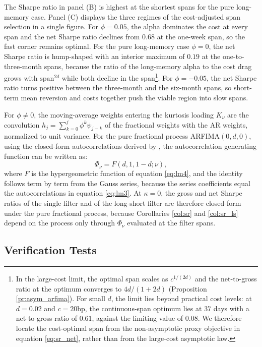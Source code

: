 \documentclass[hidelinks]{siamonline250211}
\newcommand{\spn}{\mathrm{span}}
\begin{document}
The Sharpe ratio in panel (B) is highest at the shortest spans for the pure long-memory case. Panel (C) displays the three regimes of the cost-adjusted span selection in a single figure. For $\phi=0.05$, the alpha dominates the cost at every span and the net Sharpe ratio declines from $0.68$ at the one-week span, so the fast corner remains optimal. For the pure long-memory case $\phi=0$, the net Sharpe ratio is hump-shaped with an interior maximum of $0.19$ at the one-to-three-month spans, because the ratio of the long-memory alpha to the cost drag grows with $\spn^{2d}$ while both decline in the span\footnote{In the large-cost limit, the optimal span scales as $c^{1/(2d)}$ and the net-to-gross ratio at the optimum converges to $4d/(1+2d)$ (Proposition \ref{pr:asym_arfima}). For small $d$, the limit lies beyond practical cost levels: at $d=0.02$ and $c=20$bp, the continuous-span optimum lies at $37$ days with a net-to-gross ratio of $0.61$, against the limiting value of $0.08$. We therefore locate the cost-optimal span from the non-asymptotic proxy objective in equation \eqref{eq:sr_net}, rather than from the large-cost asymptotic law.}. For $\phi=-0.05$, the net Sharpe ratio turns positive between the three-month and the six-month spans, so short-term mean reversion and costs together push the viable region into slow spans. 

For $\phi \neq 0$, the moving-average weights entering the kurtosis loading $K_{\nu}$ are the convolution $h_{j} = \sum^{j}_{k=0} \phi^{k}\psi_{j-k}$ of the fractional weights with the AR weights, normalized to unit variance. For the pure fractional process ARFIMA$(0,d,0)$, using the closed-form autocorrelations derived by \citet{Hosking1981}, the autocorrelation generating function can be written as:
\begin{equation} \label{eq:sr_agf_hyp}
	\Phi_{\nu} = F(d, 1, 1-d; \nu),
\end{equation}
where $F$ is the hypergeometric function of equation \eqref{eq:lm4}, and the identity follows term by term from the Gauss series, because the series coefficients equal the autocorrelations in equation \eqref{eq:lm3}. At $\kappa=0$, the gross and net Sharpe ratios of the single filter and of the long-short filter are therefore closed-form under the pure fractional process, because Corollaries \ref{col:sr} and \ref{col:sr_ls} depend on the process only through $\Phi_{\nu}$ evaluated at the filter spans. 



\subsection{Verification Tests}\label{ssec:sr_mc}
\end{document}
